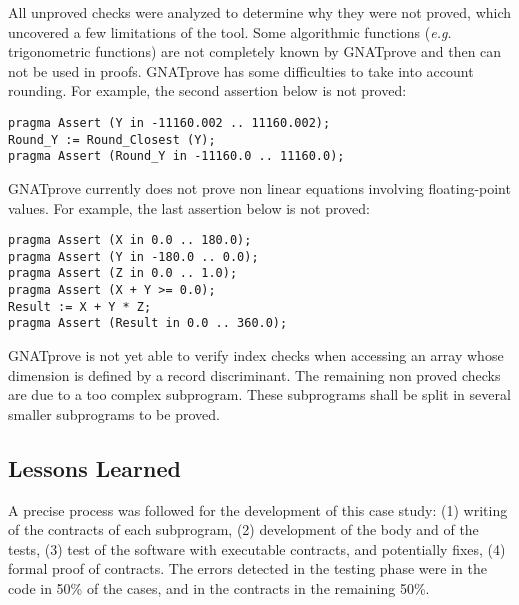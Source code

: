 \documentclass[10pt,a4paper,twocolumn]{article}
\newcommand{\gnatprove}{GNATprove\xspace}
\newcommand{\eg}{\textit{e.g.}\xspace}
\begin{document}
All unproved checks were analyzed to determine why they were not proved, which
uncovered a few limitations of the tool. Some algorithmic functions
(\eg trigonometric functions) are not completely known by \gnatprove and then
can not be used in proofs. \gnatprove has some difficulties to take into account rounding. For example, the second assertion below is not proved:
\begin{lstlisting}
pragma Assert (Y in -11160.002 .. 11160.002);
Round_Y := Round_Closest (Y);
pragma Assert (Round_Y in -11160.0 .. 11160.0);
\end{lstlisting}
\gnatprove currently does not prove non linear equations involving floating-point values. For example, the last assertion below is not proved:
\begin{lstlisting}
pragma Assert (X in 0.0 .. 180.0);
pragma Assert (Y in -180.0 .. 0.0);
pragma Assert (Z in 0.0 .. 1.0);
pragma Assert (X + Y >= 0.0);
Result := X + Y * Z;
pragma Assert (Result in 0.0 .. 360.0);
\end{lstlisting}
\gnatprove is not yet able to verify index checks when accessing an array whose
dimension is defined by a record discriminant.
The remaining non proved checks are due to a too complex subprogram.
These subprograms shall be split in several smaller subprograms to be proved.

\subsection{Lessons Learned}

A precise process was followed for the development of this case study: 
(1) writing of the contracts of each subprogram,
(2) development of the body and of the tests,
(3) test of the software with executable contracts, and potentially fixes,
(4) formal proof of contracts.
The errors detected in the testing phase were in the code 
in 50\% of the cases, and in the contracts in the remaining 50\%.
\end{document}
